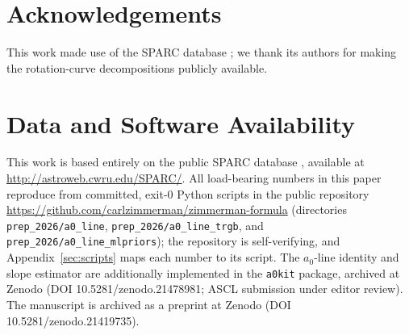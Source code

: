 \documentclass[fleqn,usenatbib]{mnras}
\begin{document}
\section*{Acknowledgements}

This work made use of the SPARC database \citep{Lelli2016}; we thank its authors for making the rotation-curve decompositions publicly available.

\section*{Data and Software Availability}

This work is based entirely on the public SPARC database \citep{Lelli2016}, available at \url{http://astroweb.cwru.edu/SPARC/}. All load-bearing numbers in this paper reproduce from committed, exit-0 Python scripts in the public repository \url{https://github.com/carlzimmerman/zimmerman-formula} (directories \texttt{prep\_2026/a0\_line}, \texttt{prep\_2026/a0\_line\_trgb}, and \texttt{prep\_2026/a0\_line\_mlpriors}); the repository is self-verifying, and Appendix~\ref{sec:scripts} maps each number to its script. The $a_0$-line identity and slope estimator are additionally implemented in the \texttt{a0kit} package, archived at Zenodo (DOI 10.5281/zenodo.21478981; ASCL submission under editor review). The manuscript is archived as a preprint at Zenodo (DOI 10.5281/zenodo.21419735).

\end{document}
